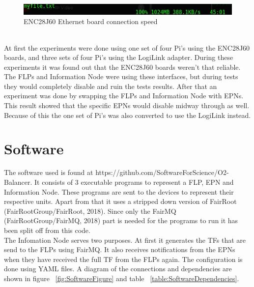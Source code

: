 \begin{figure}[htb]
	\includegraphics[width=\textwidth]{./graphics/gpio_ethernet_speed.jpg}
	\caption{ENC28J60 Ethernet board connection speed}
\end{figure}

~\\ At first the experiments were done using one set of four Pi's using the ENC28J60 boards, and three sets of four Pi's using the LogiLink adapter. During these experiments it was found out that the ENC28J60 boards weren't that reliable. The FLPs and Information Node were using these interfaces, but during tests they would completely disable and ruin the tests results. After that an experiment was done by swapping the FLPs and Information Node with EPNs. This result showed that the specific EPNs would disable midway through as well. Because of this the one set of Pi's was also converted to use the LogiLink instead.

\section{Software}
The software used is found at https://github.com/SoftwareForScience/O2-Balancer. It consists of 3 executable programs to represent a FLP, EPN and Information Node. These programs are sent to the devices to represent their respective units. Apart from that it uses a stripped down version of FairRoot (FairRootGroup/FairRoot, 2018). Since only the FairMQ (FairRootGroup/FairMQ, 2018) part is needed for the programs to run it has been split off from this code.\\
The Infomation Node serves two purposes. At first it generates the TFs that are send to the FLPs using FairMQ. It also receives notifications from the EPNs when they have received the full TF from the FLPs again. The configuration is done using YAML files. A diagram of the connections and dependencies are shown in figure ~\ref{fig:SoftwareFigure} and table ~\ref{table:SoftwareDependencies}.


